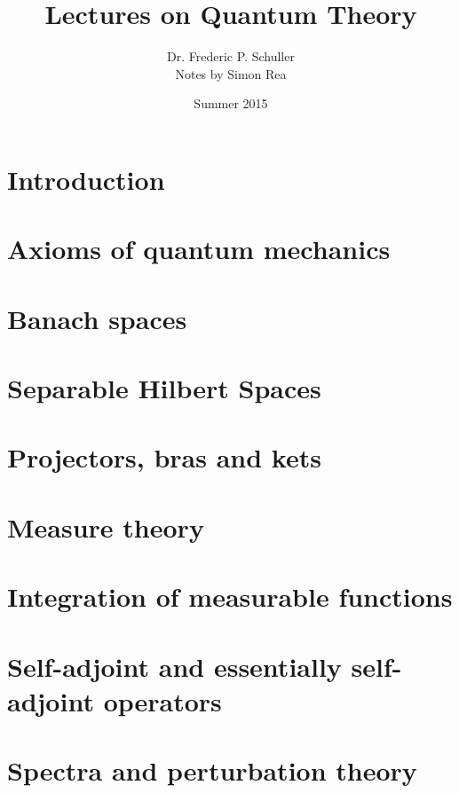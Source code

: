 \documentclass[a4paper,11pt]{report}
\title{Lectures on Quantum Theory}
\author{Dr. Frederic P. Schuller \\ \small Notes by Simon Rea}
\date{Summer 2015}
\theoremstyle{plain}
\theoremstyle{definition}
\theoremstyle{remark}
\theoremstyle{underline}
\begin{document}
 

  \maketitle 
  \tableofcontents

  \chapter*{Introduction}
  

  \chapter{Axioms of quantum mechanics}
  

  \chapter{Banach spaces}
  

  \chapter{Separable Hilbert Spaces}
  

  \chapter{Projectors, bras and kets}
  

  \chapter{Measure theory}
  

  \chapter{Integration of measurable functions}
  

  \chapter{Self-adjoint and essentially self-adjoint operators}
  

  \chapter{Spectra and perturbation theory}
  
\end{document}
